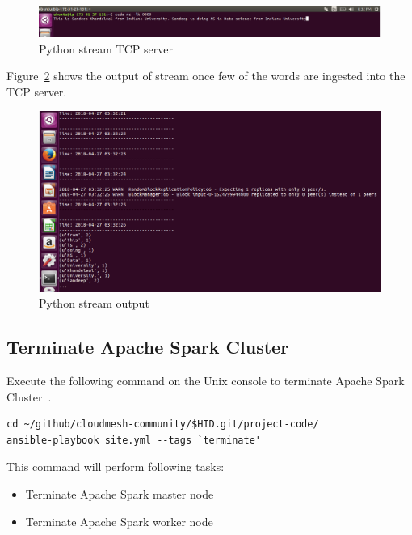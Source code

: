 \begin{figure}[!ht]
	\centering\includegraphics[width=\columnwidth]
        {images/pythonstreamtcpserver.png} \caption{Python
	stream TCP server}\label{f:python-stream-tcp-server.png}
\end{figure}

Figure~\ref{f:python_stream_prog_run_output.png} shows the output of
stream once few of the words are ingested into the TCP server.

\begin{figure}[!ht]
	\centering\includegraphics[width=\columnwidth]
        {images/pythonstreamprogrunoutput.png} \caption{Python
	stream output}\label{f:python_stream_prog_run_output.png}
\end{figure}

\subsection{Terminate Apache Spark Cluster}\label{s:cluster-terminate}

Execute the following command on the Unix console to terminate Apache
Spark Cluster~\cite{hid-sp18-511-www-spark}.

\begin{verbatim}
cd ~/github/cloudmesh-community/$HID.git/project-code/
ansible-playbook site.yml --tags `terminate'
\end{verbatim}

This command will perform following tasks:

\begin{itemize}
	\item Terminate Apache Spark master node
	\item Terminate Apache Spark worker node
\end{itemize}

